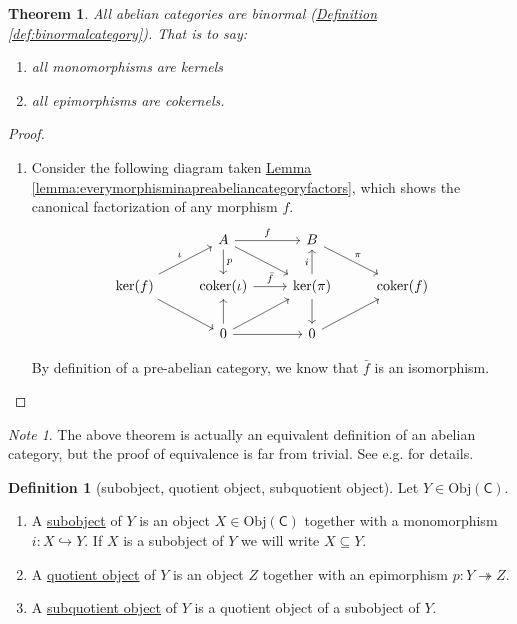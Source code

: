 \documentclass[a4paper]{report}
\newcommand{\defn}[1]{\ul{#1}}
\newcommand{\Obj}{\mathrm{Obj}}
\newcommand{\coker}{\mathrm{coker}}
\theoremstyle{definition}
\newtheorem{definition}{Definition}[section]
\theoremstyle{plain}
\newtheorem{theorem}{Theorem}[section]
\theoremstyle{remark}
\newtheorem{note}{Note}[section]
\begin{document}
\begin{theorem}
  All abelian categories are binormal (\hyperref[def:binormalcategory]{Definition \ref*{def:binormalcategory}}). That is to say: 
  \begin{enumerate}
    \item all monomorphisms are kernels
    \item all epimorphisms are cokernels.
  \end{enumerate}
\end{theorem}
\begin{proof}
  $\,$
  \begin{enumerate}
    \item Consider the following diagram taken \hyperref[lemma:everymorphisminapreabeliancategoryfactors]{Lemma \ref*{lemma:everymorphisminapreabeliancategoryfactors}}, which shows the canonical factorization of any morphism $f$.
      \begin{equation*}
        \begin{tikzcd}
          & A
          \arrow[r, "f"]
          \arrow[d, "p"]
          \arrow[dr]
          & B
          \arrow[dr, "\pi"]
          \\
          \ker(f)
          \arrow[ur, "\iota"]
          \arrow[dr]
          & \coker(\iota)
          \arrow[r, "\bar{f}"]
          & \ker(\pi)
          \arrow[u, "i"]
          \arrow[d]
          & \coker(f)
          \\
          & 0
          \arrow[u]
          \arrow[r]
          \arrow[ur]
          & 0
          \arrow[ur]
        \end{tikzcd}
      \end{equation*}

      By definition of a pre-abelian category, we know that $\bar{f}$ is an isomorphism.
  \end{enumerate}
\end{proof}

\begin{note}
  The above theorem is actually an equivalent definition of an abelian category, but the proof of equivalence is far from trivial. See e.g. \cite{freyd-abelian-categories} for details.
\end{note}

\begin{definition}[subobject, quotient object, subquotient object]
  \label{def:subobjectquotientobject}
  Let $Y \in \Obj(\mathsf{C})$.
  \begin{enumerate}
    \item A \defn{subobject} of $Y$ is an object $X \in \Obj(\mathsf{C})$ together with a monomorphism $i\colon X \hookrightarrow Y$. If $X$ is a subobject of $Y$ we will write $X \subseteq Y$.
    \item A \defn{quotient object} of $Y$ is an object $Z$ together with an epimorphism $p\colon Y \twoheadrightarrow Z$.
    \item A \defn{subquotient object} of $Y$ is a quotient object of a subobject of $Y$.
  \end{enumerate}
\end{definition}
\end{document}
